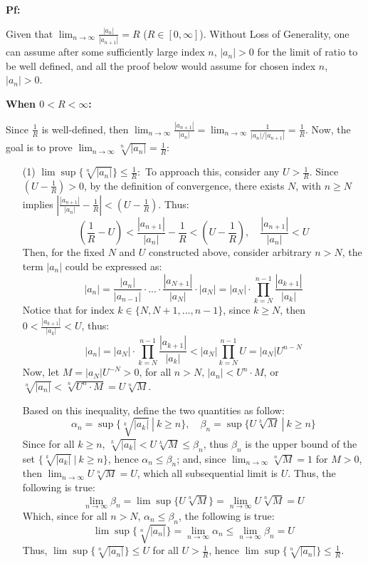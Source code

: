 \documentclass{article}
\begin{document}
\textbf{Pf:}

Given that $\lim_{n\rightarrow\infty}\frac{|a_n|}{|a_{n+1}|}=R$ ($R\in [0,\infty]$). Without Loss of Generality, one can assume after some sufficiently large index $n$, $|a_n|>0$ for the limit of ratio to be well defined, and all the proof below would 
assume for chosen index $n$, $|a_n|>0$.

\hfill

\textbf{When $0<R<\infty$:}

Since $\frac{1}{R}$ is well-defined, then $\lim_{n\rightarrow\infty}\frac{|a_{n+1}|}{|a_n|}=\lim_{n\rightarrow\infty}\frac{1}{|a_{n}|/|a_{n+1}|}=\frac{1}{R}$.
Now, the goal is to prove $\lim_{n\rightarrow\infty}\sqrt[n]{|a_n|}=\frac{1}{R}$:
\begin{itemize}
    \item[(1)] $\lim\sup \{\sqrt[n]{|a_n|}\}\leq \frac{1}{R}:$ To approach this, consider any $U>\frac{1}{R}$. Since $(U-\frac{1}{R})>0$, by the definition of convergence,
    there exists $N$, with $n\geq N$ implies $\left|\frac{|a_{n+1}|}{|a_n|}-\frac{1}{R}\right|<(U-\frac{1}{R})$. Thus:
    $$\left(\frac{1}{R}-U\right)<\frac{|a_{n+1}|}{|a_n|}-\frac{1}{R}<\left(U-\frac{1}{R}\right),\quad \frac{|a_{n+1}|}{|a_n|}<U$$
    Then, for the fixed $N$ and $U$ constructed above, consider arbitrary $n>N$, the term $|a_n|$ could be expressed as:
    $$|a_n|=\frac{|a_n|}{|a_{n-1}|}\cdot...\cdot\frac{|a_{N+1}|}{|a_N|}\cdot|a_N| = |a_N|\cdot\prod_{k=N}^{n-1}\frac{|a_{k+1}|}{|a_k|}$$
    Notice that for index $k\in\{N,N+1,...,n-1\}$, since $k\geq N$, then $0< \frac{|a_{k+1}|}{|a_k|}<U$, thus:
    $$|a_n| = |a_N|\cdot\prod_{k=N}^{n-1}\frac{|a_{k+1}|}{|a_k|} < |a_N|\prod_{k=N}^{n-1}U =  |a_N|U^{n-N}$$
    Now, let $M=|a_N|U^{-N}>0$, for all $n>N$, $|a_n|<U^n\cdot M$, or $\sqrt[n]{|a_n|}<\sqrt[n]{U^n\cdot M} = U\sqrt[n]{M}$.

    Based on this inequality, define the two quantities as follow:
    $$\alpha_n = \sup\{\sqrt[k]{|a_k|}\ |\ k\geq n\},\quad \beta_n = \sup\{U\sqrt[k]{M}\ |\ k\geq n\}$$
    Since for all $k\geq n$, $\sqrt[k]{|a_k|}<U\sqrt[k]{M}\leq \beta_n$, thus $\beta_n$ is the upper bound of the set $\{\sqrt[k]{|a_k|}\ |\ k\geq n\}$, hence $\alpha_n\leq \beta_n$;
    and, since $\lim_{n\rightarrow\infty}\sqrt[n]{M}=1$ for $M>0$, then $\lim_{n\rightarrow\infty}U\sqrt[n]{M}=U$, which all subsequential limit is $U$. Thus, the following is true:
    $$\lim_{n\rightarrow\infty}\beta_n =  \lim\sup\{U\sqrt[n]{M}\}=\lim_{n\rightarrow\infty}U\sqrt[n]{M}=U$$
    Which, since for all $n>N$, $\alpha_n\leq \beta_n$, the following is true:
    $$\lim\sup\{\sqrt[n]{|a_n|}\}=\lim_{n\rightarrow\infty}\alpha_n \leq \lim_{n\rightarrow\infty}\beta_n = U$$
    Thus, $\lim\sup\{\sqrt[n]{|a_n|}\}\leq U$ for all $U>\frac{1}{R}$, hence $\lim\sup\{\sqrt[n]{|a_n|}\}\leq \frac{1}{R}$.


\end{itemize}
\end{document}
